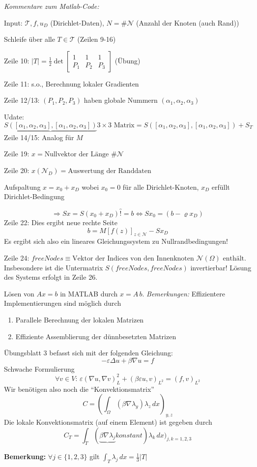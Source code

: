 \documentclass[a4paper]{amsart}
\begin{document}
\emph{Kommentare zum Matlab-Code:}\par
Input: $\mathcal{T}, f, u_D$ (Dirichlet-Daten), $N = \#\mathcal{N}$ (Anzahl der Knoten (auch Rand))\par
Schleife über alle $T\in\mathcal{T}$ (Zeilen 9-16)\par
Zeile 10: $\vert T\vert = \frac{1}{2} \det \begin{bmatrix}1 & 1 & 1\\ P_1 & P_2 & P_3\end{bmatrix}$ (Übung)\par
Zeile 11: s.o., Berechnung lokaler Gradienten\par
Zeile 12/13: $(P_1,P_2,P_3)$ haben globale Nummern $(\alpha_1,\alpha_2,\alpha_3)$\par
Udate: 
\[
	\underbrace{S([\alpha_1,\alpha_2,\alpha_3],[\alpha_1,\alpha_2,\alpha_3])}{3\times 3\text{ Matrix}} = S([\alpha_1,\alpha_2,\alpha_3],[\alpha_1,\alpha_2,\alpha_3]) + S_T
\]
Zeile 14/15: Analog für $M$\par
Zeile 19: $x = \text{Nullvektor der Länge }\#\mathcal{N}$ \par
Zeile 20: $x(\mathcal{N}_D) = \text{Auswertung der Randdaten}$\par
Aufspaltung $x = x_0 + x_D$ wobei $x_0 = 0$ für alle Dirichlet-Knoten, $x_D$ erfüllt Dirichlet-Bedingung\par
\[
	\Rightarrow Sx = S(x_0+x_D) \overbrace{!}{=} b \Leftrightarrow Sx_0 = (b-\varrho x_D)
\]
Zeile 22: Dies ergibt neue rechte Seite 
\[
	b = M \left[f(z)\right]_{z\in\mathcal{N}} - Sx_D
\]
Es ergibt sich also ein lineares Gleichungssystem zu  Nullrandbedingungen!\par
Zeile 24: $freeNodes \equiv \text{Vektor der Indices von den Innenknoten } \mathcal{N}(\Omega) \text{ enthält}$. Insbesondere ist die Untermatrix $S(freeNodes,freeNodes)$ invertierbar! Lösung des Systems erfolgt in Zeile 26.\par
Lösen von $Ax = b$ in MATLAB durch $x=A\,b$.\newline\newline\noindent
\emph{Bemerkungen: } 
Effizientere Implementierungen sind möglich durch
\begin{enumerate}
	\item Parallele Berechnung der lokalen Matrizen
	\item Effiziente Assemblierung der dünnbesetzten Matrizen
\end{enumerate}

Übungsblatt 3 befasst sich mit der folgenden Gleichung:
\[
	-\varepsilon\Delta u + \beta \nabla u = f
\]
Schwache Formulierung
\[
	\forall v\in V:\, \varepsilon(\nabla u,\nabla v)_L^2 + (\beta\varepsilon u,v)_{{L^2}} = (f,v)_{L^2}
\]
Wir benötigen also noch die ``Konvektionsmatrix''
\[
	C = \left(\int_\Omega (\beta\nabla\lambda_y)\lambda_z\, dx\right)_{y,z}
\]
Die lokale Konvektionsmatrix (auf einem Element) ist gegeben durch
\[
	C_T = \int_T(\underbrace{\beta\nabla\lambda_j}{konstant})\lambda_k\, dx)_{j,k = 1,2,3}
\]

\textbf{Bemerkung: } $\forall j\in\{1,2,3\}$ gilt $\int_T \lambda_j\,dx = \frac{1}{3}\vert T\vert$
\end{document}
